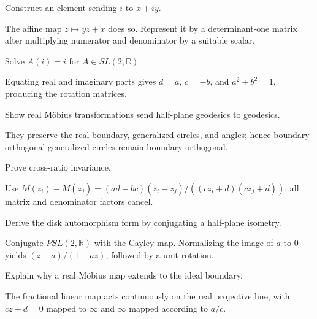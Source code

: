 \begin{problem}\label{prob:vii33-04}
Construct an element sending \(i\) to \(x+iy\).
\end{problem}
\begin{solution}
The affine map \(z\mapsto yz+x\) does so. Represent it by a determinant-one matrix after multiplying numerator and denominator by a suitable scalar.
\end{solution}

\begin{problem}\label{prob:vii33-05}
Solve \(A(i)=i\) for \(A\in SL(2,\mathbb R)\).
\end{problem}
\begin{solution}
Equating real and imaginary parts gives \(d=a\), \(c=-b\), and \(a^2+b^2=1\), producing the rotation matrices.
\end{solution}

\begin{problem}\label{prob:vii33-06}
Show real Möbius transformations send half-plane geodesics to geodesics.
\end{problem}
\begin{solution}
They preserve the real boundary, generalized circles, and angles; hence boundary-orthogonal generalized circles remain boundary-orthogonal.
\end{solution}

\begin{problem}\label{prob:vii33-07}
Prove cross-ratio invariance.
\end{problem}
\begin{solution}
Use \(M(z_i)-M(z_j)=(ad-bc)(z_i-z_j)/((cz_i+d)(cz_j+d))\); all matrix and denominator factors cancel.
\end{solution}

\begin{problem}\label{prob:vii33-08}
Derive the disk automorphism form by conjugating a half-plane isometry.
\end{problem}
\begin{solution}
Conjugate \(PSL(2,\mathbb R)\) with the Cayley map. Normalizing the image of \(a\) to \(0\) yields \((z-a)/(1-\bar a z)\), followed by a unit rotation.
\end{solution}

\begin{problem}\label{prob:vii33-09}
Explain why a real Möbius map extends to the ideal boundary.
\end{problem}
\begin{solution}
The fractional linear map acts continuously on the real projective line, with \(cz+d=0\) mapped to \(\infty\) and \(\infty\) mapped according to \(a/c\).
\end{solution}

